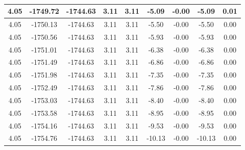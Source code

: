 \begin{table}[htbp]
\begin{adjustbox}{angle=90}
\begin{tabular}{|c|c|c|c|c|c|c|c|c|}
 4.05 & -1749.72 & -1744.63 & 3.11 & 3.11 & -5.09 & -0.00 & -5.09 & 0.01\\ \hline
 4.05 & -1750.13 & -1744.63 & 3.11 & 3.11 & -5.50 & -0.00 & -5.50 & 0.00\\ \hline
 4.05 & -1750.56 & -1744.63 & 3.11 & 3.11 & -5.93 & -0.00 & -5.93 & 0.00\\ \hline
 4.05 & -1751.01 & -1744.63 & 3.11 & 3.11 & -6.38 & -0.00 & -6.38 & 0.00\\ \hline
 4.05 & -1751.49 & -1744.63 & 3.11 & 3.11 & -6.86 & -0.00 & -6.86 & 0.00\\ \hline
 4.05 & -1751.98 & -1744.63 & 3.11 & 3.11 & -7.35 & -0.00 & -7.35 & 0.00\\ \hline
 4.05 & -1752.49 & -1744.63 & 3.11 & 3.11 & -7.86 & -0.00 & -7.86 & 0.00\\ \hline
 4.05 & -1753.03 & -1744.63 & 3.11 & 3.11 & -8.40 & -0.00 & -8.40 & 0.00\\ \hline
 4.05 & -1753.58 & -1744.63 & 3.11 & 3.11 & -8.95 & -0.00 & -8.95 & 0.00\\ \hline
 4.05 & -1754.16 & -1744.63 & 3.11 & 3.11 & -9.53 & -0.00 & -9.53 & 0.00\\ \hline
 4.05 & -1754.76 & -1744.63 & 3.11 & 3.11 & -10.13 & -0.00 & -10.13 & 0.00\\ \hline
            \end{tabular}
        \end{adjustbox}
        \caption{}
        \label{}
    \end{table}
    